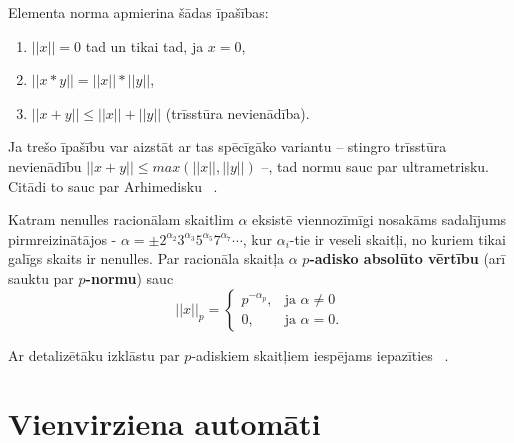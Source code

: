 \documentclass{ludis}
\begin{document}
Elementa norma apmierina šādas īpašības:
\begin{enumerate}
\item $||x||=0$ tad un tikai tad, ja $x=0$,
\item $||x*y|| = ||x||*||y||$,
\item $||x+y|| \leq ||x||+||y||$ (trīsstūra nevienādība).
\end{enumerate}
Ja trešo īpašību var aizstāt ar tas spēcīgāko variantu -- stingro trīsstūra nevienādību $||x+y|| \leq max(||x||,||y||)$ --, tad normu sauc par ultrametrisku. Citādi to sauc par Arhimedisku ~\citep{Freivalds2012}.

\begin{definicija}
Katram nenulles racionālam skaitlim $\alpha$ eksistē viennozīmīgi nosakāms sadalījums pirmreizinātājos - $\alpha = \pm 2^{\alpha_2}3^{\alpha_3}5^{\alpha_5}7^{\alpha_7} \cdots$, kur $\alpha_i$-tie ir veseli skaitļi, no kuriem tikai galīgs skaits ir nenulles. Par racionāla skaitļa $\alpha$ \textbf{$p$-adisko absolūto vērtību} (arī sauktu par \textbf{$p$-normu}) sauc 
\[
||x||_p = \begin{cases}
p^{-\alpha_p}, &\textrm{ja } \alpha \neq 0 \\
0, &\textrm{ja } \alpha = 0.
\end{cases}
\]
\end{definicija}

Ar detalizētāku izklāstu par $p$-adiskiem skaitļiem iespējams iepazīties ~\citep{Madore}.

\chapter{Vienvirziena automāti}
\end{document}
